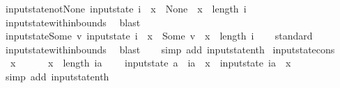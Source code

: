 \begin{isabellebody}
\isamarkupfalse%
%
\endisatagproof
{\isafoldproof}%
%
\isadelimproof
\isanewline
%
\endisadelimproof
\isanewline
{}\isamarkupfalse%
\ input{}state{\isacharunderscore}not{\isacharunderscore}None{\isacharcolon}\ {\isachardoublequoteopen}{\isacharparenleft}input{}state\ i\ {\isachardollar}\ x\ {\isasymnoteq}\ None{\isacharparenright}\ {\isasymLongrightarrow}\ {\isacharparenleft}x\ {\isacharless}\ length\ i{\isacharparenright}{\isachardoublequoteclose}\isanewline
%
\isadelimproof
\ \ %
\endisadelimproof
%
\isatagproof
{}\isamarkupfalse%
\ input{}state{\isacharunderscore}within{\isacharunderscore}bounds\ \isamarkupfalse%
\ blast%
\endisatagproof
{\isafoldproof}%
%
\isadelimproof
\isanewline
%
\endisadelimproof
\isanewline
{}\isamarkupfalse%
\ input{}state{\isacharunderscore}Some{\isacharcolon}\ {\isachardoublequoteopen}{\isacharparenleft}{\isasymexists}v{\isachardot}\ input{}state\ i\ {\isachardollar}\ x\ {\isacharequal}\ Some\ v{\isacharparenright}\ {\isacharequal}\ {\isacharparenleft}x\ {\isacharless}\ length\ i{\isacharparenright}{\isachardoublequoteclose}\isanewline
%
\isadelimproof
\ \ %
\endisadelimproof
%
\isatagproof
{}\isamarkupfalse%
\ standard\isanewline
\ \ \isamarkupfalse%
\ input{}state{\isacharunderscore}within{\isacharunderscore}bounds\ \isamarkupfalse%
\ blast\isanewline
\ \ \isamarkupfalse%
\ {\isacharparenleft}simp\ add{\isacharcolon}\ input{}state{\isacharunderscore}nth{\isacharparenright}%
\endisatagproof
{\isafoldproof}%
%
\isadelimproof
\isanewline
%
\endisadelimproof
\isanewline
{}\isamarkupfalse%
\ input{}state{\isacharunderscore}cons{\isacharcolon}\isanewline
\ \ {\isachardoublequoteopen}x{}\ {\isachargreater}\ {}\ {\isasymLongrightarrow}\isanewline
\ \ \ x{}\ {\isacharless}\ length\ ia\ {\isasymLongrightarrow}\isanewline
\ \ \ input{}state\ {\isacharparenleft}a\ {\isacharhash}\ ia{\isacharparenright}\ {\isachardollar}\ x{}\ {\isacharequal}\ input{}state\ ia\ {\isachardollar}\ {\isacharparenleft}x{}{\isacharminus}{}{\isacharparenright}{\isachardoublequoteclose}\isanewline
%
\isadelimproof
\ \ %
\endisadelimproof
%
\isatagproof
{}\isamarkupfalse%
\ {\isacharparenleft}simp\ add{\isacharcolon}\ input{}state{\isacharunderscore}nth{\isacharparenright}%
\endisatagproof

\end{isabellebody}
